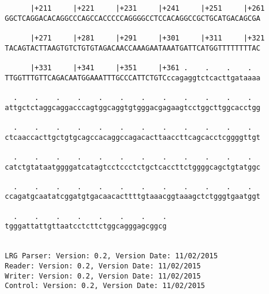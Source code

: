 \documentclass{article}
\begin{document}
\begin{Verbatim}
      |+211     |+221     |+231     |+241     |+251     |+261
GGCTCAGGACACAGGCCCAGCCACCCCCAGGGGCCTCCACAGGCCGCTGCATGACAGCGA
                                                            
      |+271     |+281     |+291     |+301     |+311     |+321
TACAGTACTTAAGTGTCTGTGTAGACAACCAAAGAATAAATGATTCATGGTTTTTTTTAC
                                                            
      |+331     |+341     |+351     |+361 .    .    .    .  
TTGGTTTGTTCAGACAATGGAAATTTGCCCATTCTGTCccagaggtctcacttgataaaa
                                                            
  .    .    .    .    .    .    .    .    .    .    .    .  
attgctctaggcaggacccagtggcaggtgtgggacgagaagtcctggcttggcacctgg
                                                            
  .    .    .    .    .    .    .    .    .    .    .    .  
ctcaaccacttgctgtgcagccacaggccagacacttaaccttcagcacctcggggttgt
                                                            
  .    .    .    .    .    .    .    .    .    .    .    .  
catctgtataatggggatcatagtcctccctctgctcaccttctggggcagctgtatggc
                                                            
  .    .    .    .    .    .    .    .    .    .    .    .  
ccagatgcaatatcggatgtgacaacacttttgtaaacggtaaagctctgggtgaatggt
                                                            
  .    .    .    .    .    .    .    .
tgggattattgttaatcctcttctggcagggagcggcg
                                      
                                      
LRG Parser: Version: 0.2, Version Date: 11/02/2015
Reader: Version: 0.2, Version Date: 11/02/2015
Writer: Version: 0.2, Version Date: 11/02/2015
Control: Version: 0.2, Version Date: 11/02/2015
\end{Verbatim}
\end{document}
